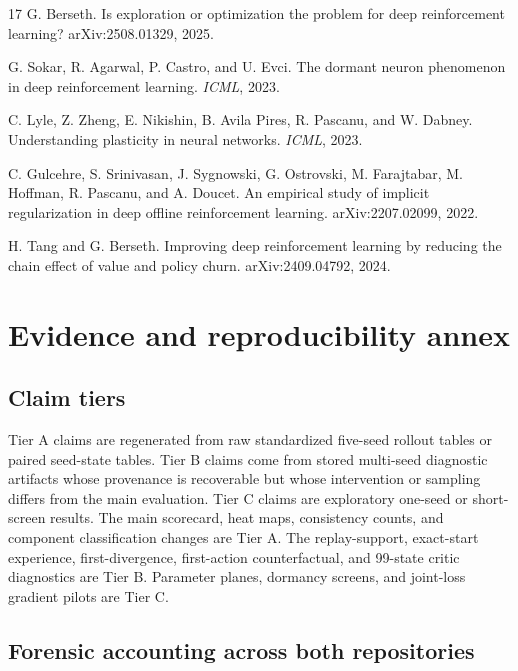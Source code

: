 \documentclass[10pt,twocolumn]{article}
\begin{document}
\begin{thebibliography}{17}
G. Berseth.
\newblock Is exploration or optimization the problem for deep reinforcement learning?
\newblock arXiv:2508.01329, 2025.

G. Sokar, R. Agarwal, P. Castro, and U. Evci.
\newblock The dormant neuron phenomenon in deep reinforcement learning.
\newblock \emph{ICML}, 2023.

C. Lyle, Z. Zheng, E. Nikishin, B. Avila Pires, R. Pascanu, and W. Dabney.
\newblock Understanding plasticity in neural networks.
\newblock \emph{ICML}, 2023.

C. Gulcehre, S. Srinivasan, J. Sygnowski, G. Ostrovski,
M. Farajtabar, M. Hoffman, R. Pascanu, and A. Doucet.
\newblock An empirical study of implicit regularization in deep offline reinforcement learning.
\newblock arXiv:2207.02099, 2022.

H. Tang and G. Berseth.
\newblock Improving deep reinforcement learning by reducing the chain effect of value and policy churn.
\newblock arXiv:2409.04792, 2024.
\end{thebibliography}

\ifdefined\REPORTBODYONLY
\else
\clearpage
\appendix

\iffalse
\appendix
\section{Evidence and reproducibility annex}
\small

\subsection{Claim tiers}

Tier A claims are regenerated from raw standardized five-seed rollout tables or paired seed-state tables. Tier B claims come from stored multi-seed diagnostic artifacts whose provenance is recoverable but whose intervention or sampling differs from the main evaluation. Tier C claims are exploratory one-seed or short-screen results. The main scorecard, heat maps, consistency counts, and component classification changes are Tier A. The replay-support, exact-start experience, first-divergence, first-action counterfactual, and 99-state critic diagnostics are Tier B. Parameter planes, dormancy screens, and joint-loss gradient pilots are Tier C.

\clearpage
\onecolumn
\subsection{Forensic accounting across both repositories}
\end{document}
